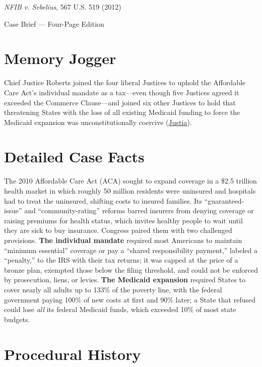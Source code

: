 \documentclass[12pt]{article}
\begin{document}
\begin{center}
{\LARGE \textit{NFIB v. Sebelius}, 567 U.S. 519 (2012)\par}
\vspace{0.8em}
{\large Case Brief --- Four-Page Edition\par}
\end{center}
\vspace{1em}

\section{Memory Jogger}

Chief Justice Roberts joined the four liberal Justices to uphold the Affordable Care Act's individual mandate as a tax---even though five Justices agreed it exceeded the Commerce Clause---and joined six other Justices to hold that threatening States with the loss of all existing Medicaid funding to force the Medicaid expansion was unconstitutionally coercive (\href{https://supreme.justia.com/cases/federal/us/567/519/}{Justia}).

\section{Detailed Case Facts}

The 2010 Affordable Care Act (ACA) sought to expand coverage in a \$2.5 trillion health market in which roughly 50 million residents were uninsured and hospitals had to treat the uninsured, shifting costs to insured families. Its ``guaranteed-issue'' and ``community-rating'' reforms barred insurers from denying coverage or raising premiums for health status, which invites healthy people to wait until they are sick to buy insurance. Congress paired them with two challenged provisions. \textbf{The individual mandate} required most Americans to maintain ``minimum essential'' coverage or pay a ``shared responsibility payment,'' labeled a ``penalty,'' to the IRS with their tax returns; it was capped at the price of a bronze plan, exempted those below the filing threshold, and could not be enforced by prosecution, liens, or levies. \textbf{The Medicaid expansion} required States to cover nearly all adults up to 133\% of the poverty line, with the federal government paying 100\% of new costs at first and 90\% later; a State that refused could lose \textit{all} its federal Medicaid funds, which exceeded 10\% of most state budgets.

\section{Procedural History}
\end{document}
